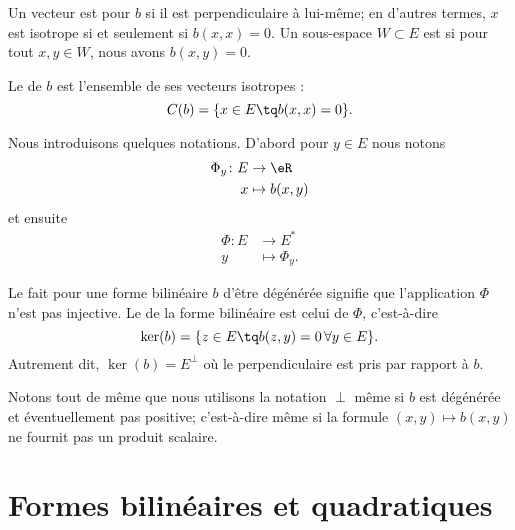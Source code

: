 \begin{definition}[Isotropie]   \label{DefVKMnUEM}
    Un vecteur est  pour \( b\) si il est perpendiculaire à lui-même; en d'autres termes, \( x\) est isotrope si et seulement si \( b(x,x)=0\). Un sous-espace \( W\subset E\) est  si pour tout \( x,y\in W\), nous avons \( b(x,y)=0\).

    Le  de \( b\) est l'ensemble de ses vecteurs isotropes :
    \begin{equation}
        C(b)=\{ x\in E\tq b(x,x)=0 \}.
    \end{equation}
\end{definition}
Nous introduisons quelques notations. D'abord pour \( y\in E\) nous notons
\begin{equation}
    \begin{aligned}
        \Phi_y\colon E&\to \eR \\
        x&\mapsto b(x,y)
    \end{aligned}
\end{equation}
et ensuite
\begin{equation}
    \begin{aligned}
        \Phi\colon E&\to E^* \\
        y&\mapsto \Phi_y.
    \end{aligned}
\end{equation}
\begin{definition}
    Le fait pour une forme bilinéaire \( b\) d'être dégénérée signifie que l'application \( \Phi\) n'est pas injective. Le  de la forme bilinéaire est celui de \( \Phi\), c'est-à-dire
    \begin{equation}
        \ker(b)=\{ z\in E\tq b(z,y)=0\,\forall y\in E \}.
    \end{equation}
    Autrement dit, \( \ker(b)=E^{\perp}\) où le perpendiculaire est pris par rapport à \( b\).
\end{definition}
Notons tout de même que nous utilisons la notation \( \perp\) même si \( b\) est dégénérée et éventuellement pas positive; c'est-à-dire même si la formule \( (x,y)\mapsto b(x,y)\) ne fournit pas un produit scalaire.

\section{Formes bilinéaires et quadratiques}

